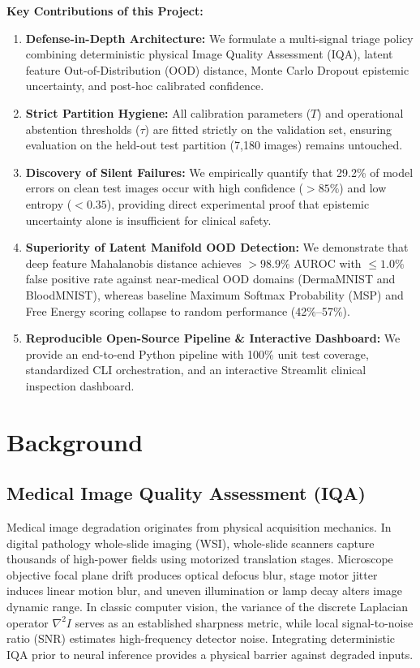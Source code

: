 \documentclass[11pt,a4paper]{article}
\begin{document}
\noindent\textbf{Key Contributions of this Project:}
\begin{enumerate}[leftmargin=*]
    \item \textbf{Defense-in-Depth Architecture:} We formulate a multi-signal triage policy combining deterministic physical Image Quality Assessment (IQA), latent feature Out-of-Distribution (OOD) distance, Monte Carlo Dropout epistemic uncertainty, and post-hoc calibrated confidence.
    \item \textbf{Strict Partition Hygiene:} All calibration parameters ($T$) and operational abstention thresholds ($\tau$) are fitted strictly on the validation set, ensuring evaluation on the held-out test partition (7,180 images) remains untouched.
    \item \textbf{Discovery of Silent Failures:} We empirically quantify that 29.2\% of model errors on clean test images occur with high confidence ($>85\%$) and low entropy ($<0.35$), providing direct experimental proof that epistemic uncertainty alone is insufficient for clinical safety.
    \item \textbf{Superiority of Latent Manifold OOD Detection:} We demonstrate that deep feature Mahalanobis distance achieves $>98.9\%$ AUROC with $\le 1.0\%$ false positive rate against near-medical OOD domains (DermaMNIST and BloodMNIST), whereas baseline Maximum Softmax Probability (MSP) and Free Energy scoring collapse to random performance (42\%--57\%).
    \item \textbf{Reproducible Open-Source Pipeline \& Interactive Dashboard:} We provide an end-to-end Python pipeline with 100\% unit test coverage, standardized CLI orchestration, and an interactive Streamlit clinical inspection dashboard.
\end{enumerate}

\section{Background}
\subsection{Medical Image Quality Assessment (IQA)}
Medical image degradation originates from physical acquisition mechanics. In digital pathology whole-slide imaging (WSI), whole-slide scanners capture thousands of high-power fields using motorized translation stages. Microscope objective focal plane drift produces optical defocus blur, stage motor jitter induces linear motion blur, and uneven illumination or lamp decay alters image dynamic range. In classic computer vision, the variance of the discrete Laplacian operator $\nabla^2 I$ serves as an established sharpness metric, while local signal-to-noise ratio (SNR) estimates high-frequency detector noise. Integrating deterministic IQA prior to neural inference provides a physical barrier against degraded inputs.
\end{document}
